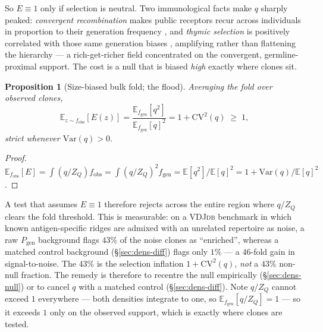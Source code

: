 \documentclass[11pt]{article}
\theoremstyle{oldplain}
\newtheorem{proposition}{Proposition}
\theoremstyle{oldrem}
\newcommand{\Pgen}{P_{\mathrm{gen}}}
\newcommand{\E}{\mathds{E}}
\begin{document}
So $E\equiv1$ only if selection is neutral. Two immunological facts make $q$ sharply peaked: \emph{convergent
recombination} makes public receptors recur across individuals in proportion to their generation frequency
\cite{Venturi2006,Quigley2010,Venturi2008}, and \emph{thymic selection} is positively correlated with those
same generation biases \cite{Elhanati2014}, amplifying rather than flattening the hierarchy --- a
rich-get-richer field concentrated on the convergent, germline-proximal support. The cost is a null that is
biased \emph{high} exactly where clones sit.

\begin{proposition}[Size-biased bulk fold; the flood]\label{prop:bulkfold}
Averaging the fold over observed clones,
\begin{equation}\label{eq:cvfold}
  \E_{z\sim f_{\mathrm{obs}}}[E(z)]
  =\frac{\E_{f_{\mathrm{gen}}}[q^2]}{\E_{f_{\mathrm{gen}}}[q]^2}
  =1+\mathrm{CV}^2(q)\;\ge\;1,
\end{equation}
strict whenever $\mathrm{Var}(q)>0$.
\end{proposition}
\begin{proof}
$\E_{f_{\mathrm{obs}}}[E]=\int (q/Z_Q)f_{\mathrm{obs}}=\int(q/Z_Q)^2 f_{\mathrm{gen}}
=\E[q^2]/\E[q]^2=1+\mathrm{Var}(q)/\E[q]^2$.
\end{proof}

A test that assumes $E\equiv1$ therefore rejects across the entire region where $q/Z_Q$ clears the fold
threshold. This is measurable: on a {\scshape VDJdb} benchmark in which known antigen-specific ridges are
admixed with an unrelated repertoire as noise, a raw $\Pgen$ background flags $43\%$ of the noise clones as
``enriched'', whereas a matched control background (\S\ref{sec:dens-diff}) flags only $1\%$ --- a $46$-fold
gain in signal-to-noise. The $43\%$ is the selection inflation $1+\mathrm{CV}^2(q)$, \emph{not} a $43\%$
non-null fraction. The remedy is therefore to recentre the null empirically (\S\ref{sec:dens-null}) or to
cancel $q$ with a matched control (\S\ref{sec:dens-diff}). Note $q/Z_Q$ cannot exceed $1$ everywhere --- both
densities integrate to one, so $\E_{f_{\mathrm{gen}}}[q/Z_Q]=1$ --- so it exceeds $1$ only on the observed
support, which is exactly where clones are tested.
\end{document}
